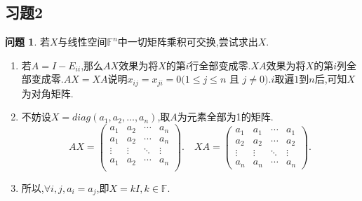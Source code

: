 \documentclass[11pt]{ctexart}
\theoremstyle{definition}
\newtheorem{qqq}{问题}[section]
\numberwithin{equation}{section}
\begin{document}
\subsection{习题2}
\begin{qqq}
    若$X$与线性空间$\mathbb{F}^n$中一切矩阵乘积可交换,尝试求出$X$.
\end{qqq}
\begin{aaa}
    \begin{enumerate}
        \item 若$A=I-E_{ii}$,那么$AX$效果为将$X$的第$i$行全部变成零.$XA$效果为将$X$的第$i$列全部变成零.$AX=XA$说明$x_{ij}=x_{ji}=0(1 \leq j \leq n$ 且 $j \neq 0).$$i$取遍$1$到$n$后,可知$X$为对角矩阵.
        \item 不妨设$X={diag}(a_1,a_2,\ldots ,a_n)$,取$A$为元素全部为1的矩阵.$$AX=\begin{pmatrix}
            a_1&a_2&\cdots &a_n\\
            a_1&a_2&\cdots &a_n\\
            \vdots&\vdots&\ddots&\vdots\\
            a_1&a_2&\cdots &a_n\\
            \end{pmatrix}.\quad XA=\begin{pmatrix}
            a_1&a_1&\cdots & a_1\\
            a_2&a_2&\cdots & a_2\\
            \vdots & \vdots & \ddots &\vdots\\
            a_n&a_n&\cdots&a_n
            \end{pmatrix}.$$
        \item 所以,$\forall i ,j,a_i=a_j$,即$X=kI,k\in \mathbb{F}$.
    \end{enumerate}
\end{aaa}
\end{document}
